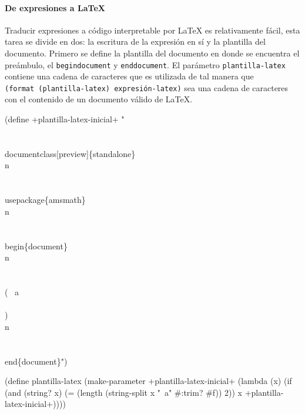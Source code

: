 \documentclass[letterpaper,twoside,openright,11pt]{book}
\begin{document}
\nwenddocs{}\paragraph{De expresiones a \LaTeX} Traducir expresiones a código interpretable por \LaTeX{} es relativamente fácil, esta tarea se divide en dos: la escritura de la expresión en sí y la plantilla del documento. Primero se define la plantilla del documento en donde se encuentra el preámbulo, el {\tt{}{}begin{}document{}} y {\tt{}{}end{}document{}}. El parámetro {\tt{}\protect{}plantilla-latex} contiene una cadena de caracteres que es utilizada de tal manera que {\tt{}(format\ (\protect{}plantilla-latex)\ expresión-latex)} sea una cadena de caracteres con el contenido de un documento válido de \LaTeX{}.

\nwenddocs{}\endmoddef
(define +plantilla-latex-inicial+
  "\\
\\\\documentclass[preview]\{standalone\}\\n\\
\\\\usepackage\{amsmath\}\\n\\
\\\\begin\{document\}\\n\\
\\\\( ~a \\\\)\\n\\
\\\\end\{document\}")

(define plantilla-latex
  (make-parameter
   +plantilla-latex-inicial+
   (lambda (x)
     (if (and (string? x) (= (length (string-split x "~a" #:trim? #f)) 2))
         x
         +plantilla-latex-inicial+))))

\eatline
{}\nwendcode{}\nwdocspar
\end{document}

